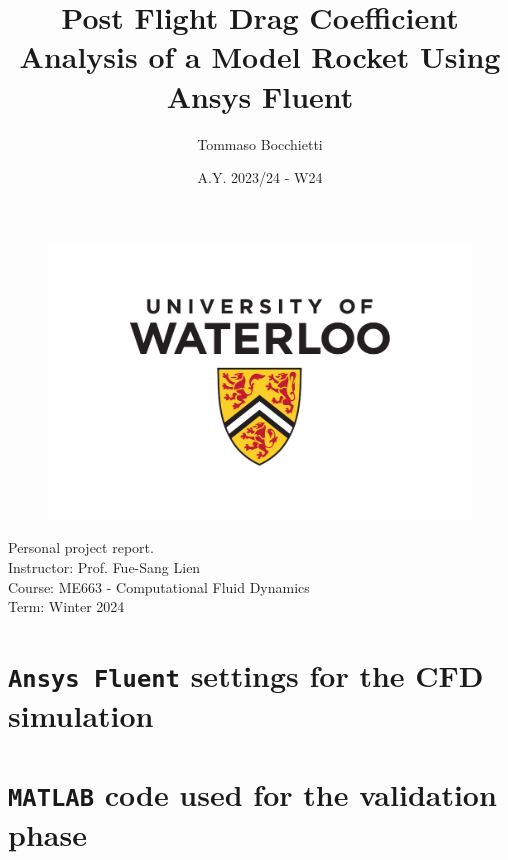 \documentclass{assignment}
\title{Post Flight Drag Coefficient Analysis of a Model Rocket Using Ansys Fluent}
\author{Tommaso Bocchietti}
\date{A.Y. 2023/24 - W24}
\begin{document}
\maketitle

\begin{figure}[H]
	\centering
	\includegraphics[width=.9\textwidth]{./pdf/UniversityOfWaterloo_logo_vert_pms}
	\label{fig:University_Of_Waterloo_logo}
\end{figure}

\vspace*{\fill}

Personal project report. \\

Instructor: Prof. Fue-Sang Lien \\
Course: ME663 - Computational Fluid Dynamics \\
Term: Winter 2024 \\

\clearpage
\tableofcontents

\clearpage
\listoffigures
\listoftables
\lstlistoflistings

\clearpage








\clearpage




\clearpage
\appendix
\label{sec:appendix}

\section{\texttt{Ansys Fluent} settings for the CFD simulation}


\section{\texttt{MATLAB} code used for the validation phase}

\end{document}

